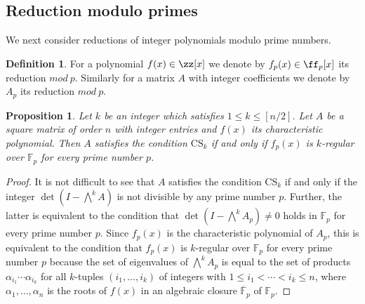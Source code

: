 \documentclass{amsart}
\theoremstyle{plain}
\newtheorem{prop}[thm]{Proposition}
\theoremstyle{definition}
\newtheorem{defn}[thm]{Definition}
\theoremstyle{remark}
\newcommand{\cb}{}
\begin{document}
\subsection{Reduction modulo primes}

We next consider reductions of integer polynomials modulo prime numbers. 
{\cb
\begin{defn}
For  a polynomial $f(x)\in \zz[x]$ we denote by
$f_p(x)\in\ff_p[x]$
its reduction $mod\ p$.
Similarly for a matrix $A$ with integer coefficients
we denote by  $A_p$ its reduction $mod\ p$.
\end{defn}
}



\begin{prop}\label{CS-regular_p}
Let $k$ be an integer which satisfies $1\leq k\leq [n/2]$. 
Let $A$ be a square matrix of order $n$ with integer entries and $f(x)$ its characteristic polynomial. 
Then $A$ satisfies the condition $\mathrm{CS}_k$ 
if and only if $f_p(x)$ is $k$-regular over $\mathbb{F}_p$ for every prime number $p$. 
\end{prop}

\begin{proof}
It is not difficult to see that $A$ satisfies the condition $\mathrm{CS}_k$ if and only if 
the integer $\det (I-\bigwedge^kA)$ is not divisible by any prime number $p$. 
Further, the latter is equivalent to the condition that $\det(I-\bigwedge^kA_p)\ne 0$ holds in $\mathbb{F}_p$ 
for every prime number $p$. Since $f_p(x)$ is the characteristic polynomial of $A_p$, 
this is equivalent to the condition that $f_p(x)$ is $k$-regular over $\mathbb{F}_p$ for every prime number $p$ 
because the set of eigenvalues of $\bigwedge^kA_p$ is equal to 
the set of products $\alpha_{i_1}\cdots \alpha_{i_k}$ 
for all $k$-tuples $(i_1,\ldots ,i_k)$ of integers with $1\leq i_1<\cdots <i_k\leq n$, 
where $\alpha_1,\ldots ,\alpha_n$ is the roots of $f(x)$ in an algebraic closure $\overline{\mathbb{F}}_p$ 
of $\mathbb{F}_p$. 
\end{proof}
\end{document}
